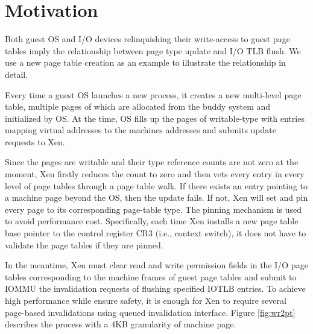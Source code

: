 \section{Motivation}






Both guest OS and I/O devices relinquishing their write-access to guest page tables imply the relationship between page type update and I/O TLB flush. We use a new page table creation as an example to illustrate the relationship in detail.

Every time a guest OS launches a new process, it creates a new multi-level page table, multiple pages of which are allocated from the buddy system and initialized by OS. At the time, OS fills up the pages of writable-type with entries mapping virtual addresses to the machines addresses and submits update requests to Xen.

Since the pages are writable and their type reference counts are not zero at the moment, Xen firstly reduces the count to zero and then vets every entry in every level of page tables through a page table walk. If there exists an entry pointing to a machine page beyond the OS, then the update fails. If not, Xen will set and pin every page to its corresponding page-table type. The pinning mechanism is used to avoid performance cost. Specifically, each time Xen installs a new page table base pointer to the control register CR3 (i.e., context switch), it does not have to validate the page tables if they are pinned.

In the meantime, Xen must clear read and write permission fields in the I/O page tables corresponding to the machine frames of guest page tables and submit to IOMMU the invalidation requests of flushing specified IOTLB entries. To achieve high performance while ensure safety, it is enough for Xen to require several page-based invalidations using queued invalidation interface. Figure \ref{fig:wr2pt} describes the process with a 4KB granularity of machine page.

